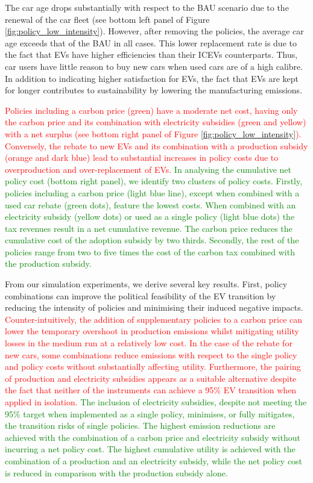 \documentclass[12pt]{article}
\begin{document}
	The car age drops substantially with respect to the BAU scenario due to the renewal of the car fleet (see bottom left panel of Figure \ref{fig:policy_low_intensity}). However, after removing the policies, the average car age exceeds that of the BAU in all cases. This lower replacement rate is due to the fact that EVs have higher efficiencies than their ICEVs counterparts. Thus, car users have little reason to buy new cars when used cars are of a high calibre. In addition to indicating higher satisfaction for EVs, the fact that EVs are kept for longer contributes to sustainability by lowering the manufacturing emissions. 
	
	\textcolor{red}{Policies including a carbon price (green) have a moderate net cost, having only the carbon price and its combination with electricity subsidies (green and yellow) with a net surplus (see bottom right panel of Figure \ref{fig:policy_low_intensity}). Conversely, the rebate to new EVs and its combination with a production subsidy (orange and dark blue) lead to substantial increases in policy costs due to overproduction and over-replacement of EVs.} %
    \textcolor{green}{In analysing the cumulative net policy cost (bottom right panel), we identify two clusters of policy costs. Firstly, policies including a carbon price (light blue line), except when combined with a used car rebate (green dots), feature the lowest costs. When combined with an electricity subsidy (yellow dots) or used as a single policy (light blue dots) the tax revenues result in a net cumulative revenue. The carbon price reduces the cumulative cost of the adoption subsidy by two thirds. Secondly, the rest of the policies range from two to five times the cost of the carbon tax combined with the production subsidy.}
	
	From our simulation experiments, we derive several key results. First, policy combinations can improve the political feasibility of the EV transition by reducing the intensity of policies and minimising their induced negative impacts. \textcolor{red}{Counter-intuitively, the addition of supplementary policies to a carbon price can lower the temporary overshoot in production emissions whilst mitigating utility losses in the medium run at a relatively low cost. In the case of the rebate for new cars, some combinations reduce emissions with respect to the single policy and policy costs without substantially affecting utility. Furthermore, the pairing of production and electricity subsidies appears as a suitable alternative despite the fact that neither of the instruments can achieve a 95\% EV transition when applied in isolation.} \textcolor{green}{The inclusion of electricity subsidies, despite not meeting the 95\% target when implemented as a single policy, minimises, or fully mitigates, the transition risks of single policies. The highest emission reductions are achieved with the combination of a carbon price and electricity subsidy without incurring a net policy cost. The highest cumulative utility is achieved with the combination of a production and an electricity subsidy, while the net policy cost is reduced in comparison with the production subsidy alone.}
	
\end{document}

